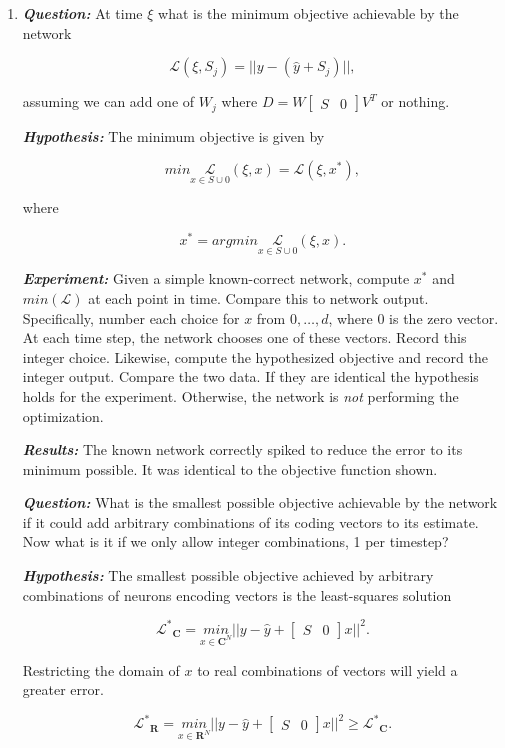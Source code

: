 \begin{enumerate}
\item \textbf{\textit{Question:}} At time $\xi$ what is the minimum objective achievable by the network

$$
\mathcal{L}(\xi, S_j) = ||y - (\hat{y} + S_j)||,
$$

assuming we can add one of $W_j $ where $D = W \begin{bmatrix} S & 0 \end{bmatrix} V^T$ or nothing. 

\textbf{\textit{Hypothesis:}} The minimum objective is given by

$$
min \underset{x \in S \cup {0}}{\mathcal{L}}(\xi, x) = \mathcal{L}(\xi, x^*), 
$$

where 

$$
x^* = argmin \underset{x \in S \cup {0}}{\mathcal{L}}(\xi, x).
$$

\textbf{\textit{Experiment:}} Given a simple known-correct network, compute $x^*$ and $min(\mathcal{L})$ at each point in time. Compare this to network output.  
Specifically, number each choice for $x$ from $0, \ldots, d$, where $0$ is the zero vector. At each time step, the network chooses one of these vectors. Record this integer choice. Likewise, compute the hypothesized objective and record the integer output.  Compare the two data. If they are identical the hypothesis holds for the experiment. Otherwise, the network is \textit{not} performing the optimization. 

\textbf{\textit{Results:}}  The known network correctly spiked to reduce the error to its minimum possible. It was identical to the objective function shown.  

\textbf{\textit{Question:}} What is the smallest possible objective achievable by the network if it could add arbitrary combinations of its coding vectors to its estimate. Now what is it if we only allow integer combinations, 1 per timestep? 

\textbf{\textit{Hypothesis:}} The smallest possible objective achieved by arbitrary combinations of neurons encoding vectors is the least-squares solution

$$
\mathcal{L^*}_{\mathbf{C}} = \underset{x \in \mathbf{C}^N}{min}||y - \hat{y} + \begin{bmatrix} S & 0 \end{bmatrix} x||^2. 
$$

Restricting the domain of $x$ to real combinations of vectors will yield a greater error.

$$
\mathcal{L^*}_\mathbf{R} = \underset{x \in \mathbf{R}^N}{min}||y - \hat{y} + \begin{bmatrix} S & 0 \end{bmatrix} x||^2 \geq \mathcal{L^*}_{\mathbf{C}}.
$$



\end{enumerate}
